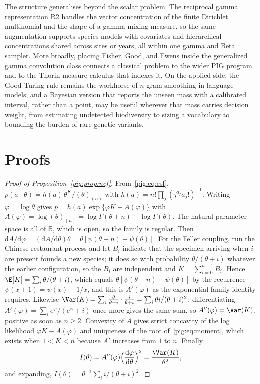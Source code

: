 The structure generalises beyond the scalar problem. The reciprocal gamma representation R2 handles the vector concentration of the finite Dirichlet multinomial and the shape of a gamma mixing measure, so the same augmentation supports species models with covariates and hierarchical concentrations shared across sites or years, all within one gamma and Beta sampler. More broadly, placing Fisher, Good, and Ewens inside the generalized gamma convolution class connects a classical problem to the wider PIG program and to the Thorin measure calculus that indexes it. On the applied side, the Good Turing rule remains the workhorse of $n$ gram smoothing in language models, and a Bayesian version that reports the unseen mass with a calibrated interval, rather than a point, may be useful wherever that mass carries decision weight, from estimating undetected biodiversity to sizing a vocabulary to bounding the burden of rare genetic variants.

\section{Proofs}\label{pig:sec:proofs}

\begin{proof}[Proof of Proposition~\ref{pig:prop:nef}]
From~\eqref{pig:eq:esf}, $p(a\mid\theta)=h(a)\,\theta^K/(\theta)_{(n)}$ with $h(a)=n!\prod_j(j^{a_j}a_j!)^{-1}$. Writing $\varphi=\log\theta$ gives $p=h(a)\exp\{\varphi K-A(\varphi)\}$ with $A(\varphi)=\log(\theta)_{(n)}=\log\Gamma(\theta+n)-\log\Gamma(\theta)$. The natural parameter space is all of $\mathbb{R}$, which is open, so the family is regular. Then $\mathrm{d}A/\mathrm{d}\varphi=(\mathrm{d}A/\mathrm{d}\theta)\theta=\theta[\psi(\theta+n)-\psi(\theta)]$. For the Feller coupling, run the Chinese restaurant process and let $B_i$ indicate that the specimen arriving when $i$ are present founds a new species; it does so with probability $\theta/(\theta+i)$ whatever the earlier configuration, so the $B_i$ are independent and $K=\sum_{i=0}^{n-1}B_i$. Hence $\E[K]=\sum_i\theta/(\theta+i)$, which equals $\theta[\psi(\theta+n)-\psi(\theta)]$ by the recurrence $\psi(x+1)=\psi(x)+1/x$, and this is $A'(\varphi)$ as the exponential family identity requires. Likewise $\Var(K)=\sum_i\frac{\theta}{\theta+i}\cdot\frac{i}{\theta+i}=\sum_i\theta i/(\theta+i)^2$; differentiating $A'(\varphi)=\sum_i e^\varphi/(e^\varphi+i)$ once more gives the same sum, so $A''(\varphi)=\Var(K)$, positive as soon as $n\ge2$. Convexity of $A$ gives strict concavity of the log likelihood $\varphi K-A(\varphi)$ and uniqueness of the root of~\eqref{pig:eq:moment}, which exists when $1<K<n$ because $A'$ increases from $1$ to $n$. Finally
\[
I(\theta)=A''(\varphi)\Bigl(\frac{\mathrm{d}\varphi}{\mathrm{d}\theta}\Bigr)^2=\frac{\Var(K)}{\theta^2},
\]
and expanding, $I(\theta)=\theta^{-1}\sum_i i/(\theta+i)^2$.
\end{proof}

